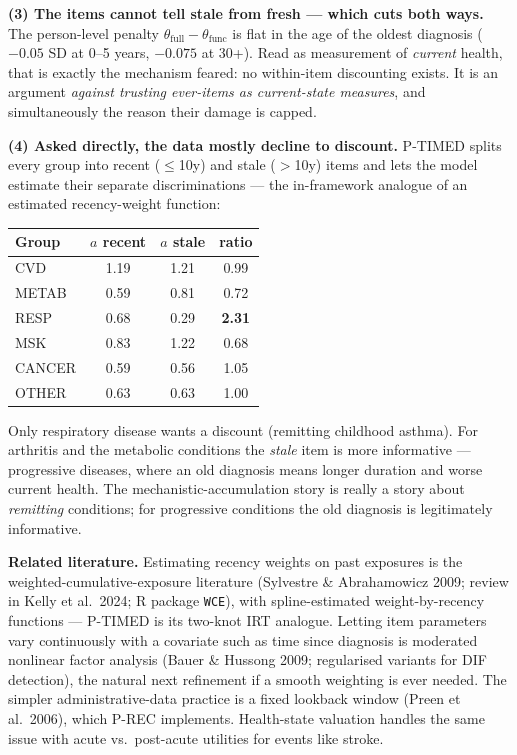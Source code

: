 \documentclass[11pt]{article}
\newcommand{\code}[1]{\texttt{\small #1}}
\begin{document}
\textbf{(3) The items cannot tell stale from fresh --- which cuts both
ways.} The person-level penalty $\theta_{\mathrm{full}} -
\theta_{\mathrm{func}}$ is flat in the age of the oldest diagnosis ($-0.05$
SD at 0--5 years, $-0.075$ at 30+). Read as measurement of \emph{current}
health, that is exactly the mechanism feared: no within-item discounting
exists. It is an argument \emph{against trusting ever-items as current-state
measures}, and simultaneously the reason their damage is capped.

\textbf{(4) Asked directly, the data mostly decline to discount.} P-TIMED
splits every group into recent ($\le$10y) and stale ($>$10y) items and lets
the model estimate their separate discriminations --- the in-framework
analogue of an estimated recency-weight function:

\begin{center}\small
\begin{tabular}{lccc}
\toprule
Group & $a$ recent & $a$ stale & ratio \\
\midrule
CVD & 1.19 & 1.21 & 0.99 \\
METAB & 0.59 & 0.81 & 0.72 \\
RESP & 0.68 & 0.29 & \textbf{2.31} \\
MSK & 0.83 & 1.22 & 0.68 \\
CANCER & 0.59 & 0.56 & 1.05 \\
OTHER & 0.63 & 0.63 & 1.00 \\
\bottomrule
\end{tabular}
\end{center}

Only respiratory disease wants a discount (remitting childhood asthma). For
arthritis and the metabolic conditions the \emph{stale} item is more
informative --- progressive diseases, where an old diagnosis means longer
duration and worse current health. The mechanistic-accumulation story is
really a story about \emph{remitting} conditions; for progressive conditions
the old diagnosis is legitimately informative.

\textbf{Related literature.} Estimating recency weights on past exposures is
the weighted-cumulative-exposure literature (Sylvestre \& Abrahamowicz 2009;
review in Kelly et al.\ 2024; R package \code{WCE}), with spline-estimated
weight-by-recency functions --- P-TIMED is its two-knot IRT analogue.
Letting item parameters vary continuously with a covariate such as time
since diagnosis is moderated nonlinear factor analysis (Bauer \& Hussong
2009; regularised variants for DIF detection), the natural next refinement
if a smooth weighting is ever needed. The simpler administrative-data
practice is a fixed lookback window (Preen et al.\ 2006), which P-REC
implements. Health-state valuation handles the same issue with acute
vs.\ post-acute utilities for events like stroke.
\end{document}
